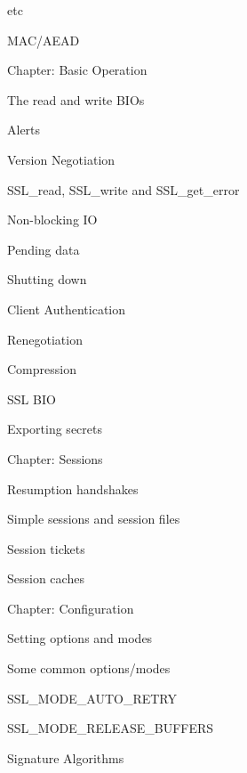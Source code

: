 \documentclass[oneside]{book}
\begin{document}
\begin{outline}
\begin{outline}
\begin{outline}
\begin{outline}
        \item{etc}
      \end{outline}
      \item{MAC/AEAD}
    \end{outline}
    \item{Chapter: Basic Operation}
    \begin{outline}
      \item{The read and write BIOs}
      \item{Alerts}
      \item{Version Negotiation}
      \item{SSL\_read, SSL\_write and SSL\_get\_error}
      \begin{outline}
        \item{Non-blocking IO}
        \item{Pending data}
      \end{outline}
      \item{Shutting down}
      \item{Client Authentication}
      \item{Renegotiation}
      \item{Compression}
      \item{SSL BIO}
      \item{Exporting secrets}
    \end{outline}
    \item{Chapter: Sessions}
    \begin{outline}
      \item{Resumption handshakes}
      \item{Simple sessions and session files}
      \item{Session tickets}
      \item{Session caches}
    \end{outline}
    \item{Chapter: Configuration}
    \begin{outline}
      \item{Setting options and modes}
      \begin{outline}
        \item{Some common options/modes}
        \begin{outline}
          \item{SSL\_MODE\_AUTO\_RETRY}
          \item{SSL\_MODE\_RELEASE\_BUFFERS}
        \end{outline}
      \end{outline}
      \item{Signature Algorithms}

\end{outline}
\end{outline}
\end{outline}
\end{document}
